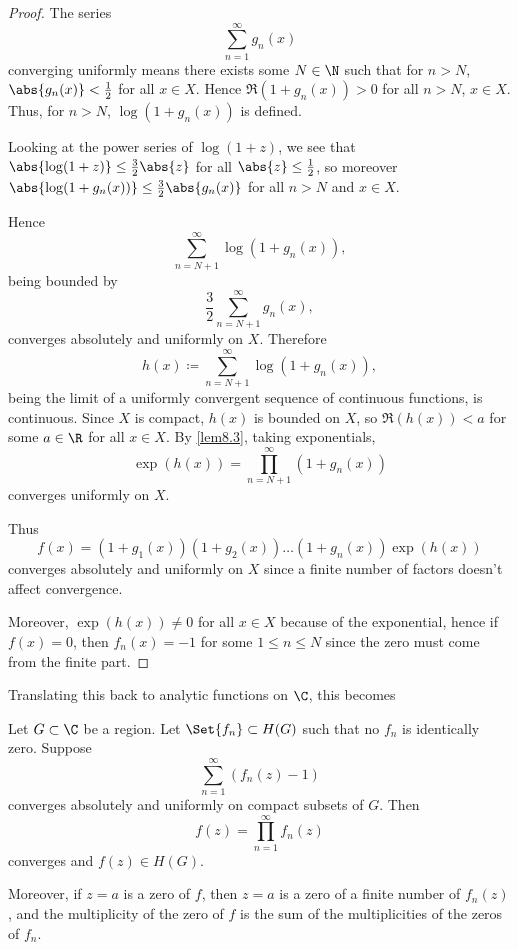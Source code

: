 \begin{proof}
	The series
	\[
		\sum_{n = 1}^\infty g_n(x)
	\]
	converging uniformly means there exists some $N \in \N$ such that for $n > N$, $\abs{g_n(x)} < \frac{1}{2}$ for all $x \in X$.
	Hence $\Re(1 + g_n(x)) > 0$ for all $n > N$, $x \in X$.
	Thus, for $n > N$, $\log(1 + g_n(x))$ is defined.

	Looking at the power series of $\log(1 + z)$, we see that $\abs{\log(1 + z)} \leq \frac{3}{2} \abs{z}$ for all $\abs{z} \leq \frac{1}{2}$, so moreover $\abs{\log(1 + g_n(x))} \leq \frac{3}{2} \abs{g_n(x)}$ for all $n > N$ and $x \in X$.

	Hence
	\[
		\sum_{n = N + 1}^\infty \log(1 + g_n(x)),
	\]
	being bounded by
	\[
		\frac{3}{2} \sum_{n = N + 1}^\infty g_n(x),
	\]
	converges absolutely and uniformly on $X$.
	Therefore
	\[
		h(x) \coloneqq \sum_{n = N + 1}^\infty \log(1 + g_n(x)),
	\]
	being the limit of a uniformly convergent sequence of continuous functions, is continuous.
	Since $X$ is compact, $h(x)$ is bounded on $X$, so $\Re(h(x)) < a$ for some $a \in \R$ for all $x \in X$.
	By \autoref{lem8.3}, taking exponentials,
	\[
		\exp(h(x)) = \prod_{n = N + 1}^\infty (1 + g_n(x))
	\]
	converges uniformly on $X$.

	Thus
	\[
		f(x) = (1 + g_1(x)) (1 + g_2(x)) \dots (1 + g_n(x)) \exp(h(x))
	\]
	converges absolutely and uniformly on $X$ since a finite number of factors doesn't affect convergence.

	Moreover, $\exp(h(x)) \neq 0$ for all $x \in X$ because of the exponential, hence if $f(x) = 0$, then $f_n(x) = -1$ for some $1 \leq n \leq N$ since the zero must come from the finite part.
\end{proof}

Translating this back to analytic functions on $\C$, this becomes
\begin{theorem}\label{thm8.5}
	Let $G \subset \C$ be a region.
	Let $\Set{f_n} \subset H(G)$ such that no $f_n$ is identically zero.
	Suppose
	\[
		\sum_{n = 1}^\infty (f_n(z) - 1)
	\]
	converges absolutely and uniformly on compact subsets of $G$.
	Then
	\[
		f(z) = \prod_{n = 1}^\infty f_n(z)
	\]
	converges and $f(z) \in H(G)$.

	Moreover, if $z = a$ is a zero of $f$, then $z = a$ is a zero of a finite number of $f_n(z)$, and the multiplicity of the zero of $f$ is the sum of the multiplicities of the zeros of $f_n$.
\end{theorem}
